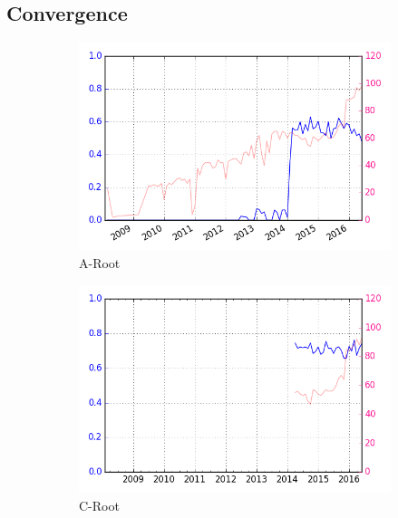 \begin{appendices}
	\chapter{Convergence}
	\label{app:convergence}
	\begin{figure}[!htb]
		\centering
		\begin{subfigure}{.32\textwidth}
			\centering
			\includegraphics[width=\linewidth]{img/convergence_over_time_a.png}
			\caption{A-Root}
			\label{fig:convergence-a}			
		\end{subfigure}
		\begin{subfigure}{.32\textwidth}
			\centering
			\includegraphics[width=\linewidth]{img/convergence_over_time_c.png}
			\caption{C-Root}
			\label{fig:convergence-c}
		\end{subfigure}		
		\begin{subfigure}{.32\textwidth}

\end{subfigure}
\end{figure}
\end{appendices}
